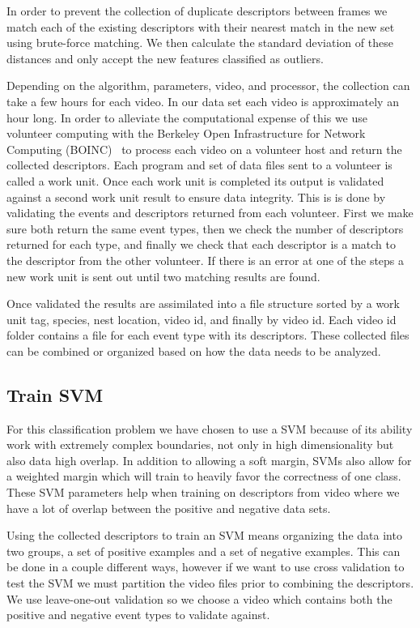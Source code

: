 In order to prevent the collection of duplicate descriptors between frames we match each of the existing descriptors with their nearest match in the new set using brute-force matching. We then calculate the standard deviation of these distances and only accept the new features classified as outliers.

Depending on the algorithm, parameters, video, and processor, the collection can take a few hours for each video. In our data set each video is approximately an hour long. In order to alleviate the computational expense of this we use volunteer computing with the Berkeley Open Infrastructure for Network Computing (BOINC)~\cite{anderson_2004_boinc} to process each video on a volunteer host and return the collected descriptors. Each program and set of data files sent to a volunteer is called a work unit. Once each work unit is completed its output is validated against a second work unit result to ensure data integrity. This is is done by validating the events and descriptors returned from each volunteer. First we make sure both return the same event types, then we check the number of descriptors returned for each type, and finally we check that each descriptor is a match to the descriptor from the other volunteer. If there is an error at one of the steps a new work unit is sent out until two matching results are found.

Once validated the results are assimilated into a file structure sorted by a work unit tag, species, nest location, video id, and finally by video id. Each video id folder contains a file for each event type with its descriptors. These collected files can be combined or organized based on how the data needs to be analyzed.


\subsection{Train SVM}
\label{sec:train_svm}

For this classification problem we have chosen to use a SVM because of its ability work with extremely complex boundaries, not only in high dimensionality but also data high overlap. In addition to allowing a soft margin, SVMs also allow for a weighted margin which will train to heavily favor the correctness of one class. These SVM parameters help when training on descriptors from video where we have a lot of overlap between the positive and negative data sets.

Using the collected descriptors to train an SVM means organizing the data into two groups, a set of positive examples and a set of negative examples. This can be done in a couple different ways, however if we want to use cross validation to test the SVM we must partition the video files prior to combining the descriptors. We use leave-one-out validation so we choose a video which contains both the positive and negative event types to validate against.

